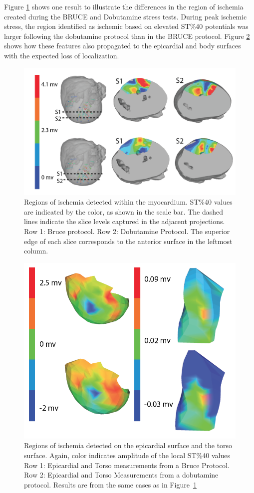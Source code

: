 \documentclass[twocolumn]{cinc}
\begin{document}
Figure \ref{fig:myo} shows one result to illustrate
the differences in the region of ischemia created during the BRUCE and
Dobutamine stress tests. During peak ischemic stress, the region
identified as ischemic based on elevated ST\%40 potentials was
larger following the dobutamine protocol than in the BRUCE protocol. 
Figure \ref{fig:epitorso} shows how these features also
propagated to the epicardial and body surfaces with the expected loss of
localization.


\begin{figure}
	\centering
	\includegraphics[width = .45\textwidth]{../Figures/1.png}
	
	\caption{Regions of ischemia detected within the myocardium. ST\%40 values are indicated by the color, as shown in the scale bar. The dashed lines indicate the slice
          levels captured in the adjacent projections. Row 1: Bruce
          protocol. Row 2: Dobutamine Protocol. The superior edge of each
          slice corresponds to the anterior surface in the leftmost
          column.}
	\label{fig:myo}
\end{figure}

\begin{figure}
	\centering
	\includegraphics[width = .45\textwidth]{../Figures/2.png}

	\caption{Regions of ischemia detected on the epicardial surface and
          the torso surface. Again, color indicates
          amplitude of the local ST\%40 values Row 1: Epicardial and
          Torso measurements from a Bruce Protocol. Row 2: Epicardial and
          Torso Measurements from a dobutamine protocol.  Results are
          from the same cases as in Figure~\ref{fig:myo}}
	\label{fig:epitorso}
\end{figure}
\end{document}
